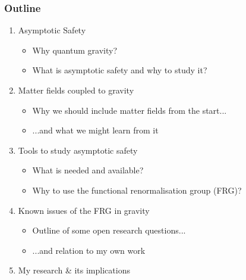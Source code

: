 \documentclass[]{beamer}  %
\begin{document}
\begin{frame}
  \frametitle{Outline}
  \begin{enumerate}[I]
    \item
      Asymptotic Safety
      \begin{itemize}
        \item Why quantum gravity?
        \item What is asymptotic safety and why to study it?
      \end{itemize}
      \vfill
    \item
      Matter fields coupled to gravity
      \begin{itemize}
        \item Why we should include matter fields from the start...
        \item ...and what we might learn from it
      \end{itemize}
      \vfill
    \item
      Tools to study asymptotic safety
      \begin{itemize}
        \item What is needed and available?
        \item Why to use the functional renormalisation group (FRG)?
      \end{itemize}
      \vfill
    \item
      Known issues of the FRG in gravity
      \begin{itemize}
        \item Outline of some open research questions...
        \item ...and relation to my own work
      \end{itemize}
      \vfill
    \item
      My research \& its implications
  \end{enumerate}
\end{frame}


\end{document}

